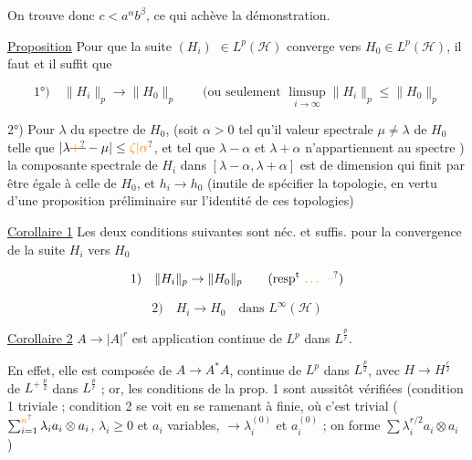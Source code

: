 On trouve donc $c<a^\alpha b^\beta$, ce qui achève la démonstration.

\uline{Proposition} Pour que la suite $(H_i)$  $\in L^p(\mathscr H)$ converge vers $H_0\in L^p(\mathscr H)$, il faut et il suffit que

\[
\text{1°)}\quad\|H_i\|_p\to\|H_0\|_p\qquad
\text{(ou seulement }\limsup_{i\to\infty}\|H_i\|_p\leq\|H_0\|_p
\]

2°) Pour  $\lambda$ du spectre de $H_0$, (soit $\alpha>0$ tel qu'il  valeur spectrale $\mu\neq\lambda$ de $H_0$ telle que $|\lambda\deleted{\unsure{+}}-\mu|\leq\unsure{\zeta|\alpha}$,   et tel que $\lambda-\alpha$ et $\lambda+\alpha$ n'appartiennent au spectre )  la composante spectrale de $H_i$  dans $[\lambda-\alpha,\lambda+\alpha]$ est de dimension  qui finit par être égale à celle de $H_0$, et $h_i\to h_0$ (inutile de spécifier la topologie, en vertu d'une proposition préliminaire sur l'identité de  ces topologies)


\uline{Corollaire 1} Les deux conditions suivantes sont néc. et suffis.  pour la convergence de la suite $H_i$ vers $H_0$

\[
\text{1)}\quad\|H_i\|_p\to\|H_0\|_p\qquad\text{(resp$^{\mathrm t}$ \unsure{\ldots{} --})}
\]

\[
\text{2)}\quad H_i\to H_0\quad\text{dans }L^\infty(\mathscr H)
\]

\uline{Corollaire 2} $A\to |A|^r$ est application continue de $L^p$ dans $L^{\frac pr}$.

En effet, elle est composée de $A\to A^*A$, continue de $L^p$ dans $L^{\frac p2}$, avec
$H\to H^{\frac r2}$ de $L^{+\;\frac p2}$ dans $L^{\frac pr}$ ; or, les conditions de la prop. 1 sont aussitôt vérifiées  (condition 1 triviale ; condition 2 se voit  en se ramenant à  finie, où c'est trivial ($\sum_{i=1}^{\unsure{n}}\lambda_i a_i\otimes a_i$, $\lambda_i\geq0$ et $a_i$ variables, $\to\lambda_i^{(0)}$ et $a_i^{(0)}$ ; on forme $\sum\lambda_i^{r/2}a_i\otimes a_i$ \unsure{\ldots{} --})

